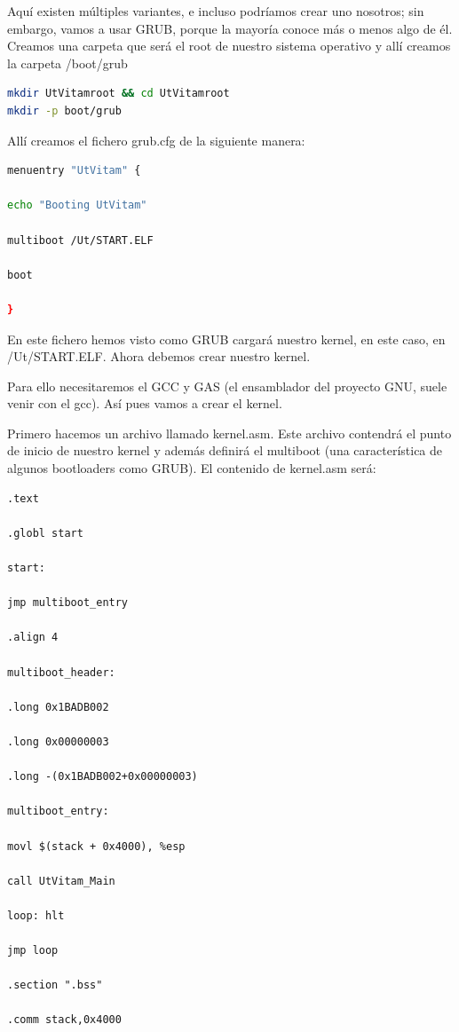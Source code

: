 \documentclass[12pt, twoside]{report}
\begin{document}
Aquí existen múltiples variantes, e incluso podríamos crear uno nosotros; sin embargo, vamos a usar GRUB, porque la mayoría conoce más o menos algo de él. Creamos una carpeta que será el root de nuestro sistema operativo y allí creamos la carpeta /boot/grub

\begin{lstlisting}[language=bash]
mkdir UtVitamroot && cd UtVitamroot
mkdir -p boot/grub
\end{lstlisting}

Allí creamos el fichero grub.cfg de la siguiente manera:

\begin{lstlisting}[language=bash]
menuentry "UtVitam" {

echo "Booting UtVitam"

multiboot /Ut/START.ELF

boot

}
\end{lstlisting}


En este fichero hemos visto como GRUB cargará nuestro kernel, en este caso, en /Ut/START.ELF. Ahora debemos crear nuestro kernel.

Para ello necesitaremos el GCC y GAS (el ensamblador del proyecto GNU, suele venir con el gcc). Así pues vamos a crear el kernel.

Primero hacemos un archivo llamado kernel.asm. Este archivo contendrá el punto de inicio de nuestro kernel y además definirá el multiboot (una característica de algunos bootloaders como GRUB). El contenido de kernel.asm será:

\begin{lstlisting}[language={[x86masm]Assembler}]
.text

.globl start

start:

jmp multiboot_entry

.align 4

multiboot_header:

.long 0x1BADB002

.long 0x00000003

.long -(0x1BADB002+0x00000003)

multiboot_entry:

movl $(stack + 0x4000), %esp

call UtVitam_Main

loop: hlt

jmp loop

.section ".bss"

.comm stack,0x4000

\end{lstlisting}
\end{document}

